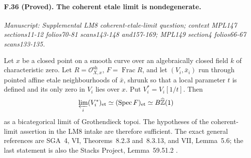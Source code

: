 \paragraph{F.36 (Proved). The coherent etale limit is nondegenerate.}
\textit{Manuscript: Supplemental LM8 coherent-etale-limit question; context MPL147 sections11-12 folios70-81 scans143-148 and157-169; MPL149 section4 folios66-67 scans133-135.}

Let $x$ be a closed point on a smooth curve over an algebraically closed
field $k$ of characteristic zero. Let $R=\mathcal O_{X,x}^{\mathrm{sh}}$,
$F=\operatorname{Frac}R$, and let $(V_i,\bar x_i)$ run through pointed
affine etale neighbourhoods of $\bar x$, shrunk so that a local parameter
$t$ is defined and its only zero in $V_i$ lies over $x$. Put
$V_i^*=V_i[1/t]$. Then
\[
 \varprojlim_i (V_i^*)_{\mathrm{et}}
   \simeq (\operatorname{Spec}F)_{\mathrm{et}}
   \simeq B\widehat{\mathbb Z}(1)
\]
as a bicategorical limit of Grothendieck topoi. The hypotheses of the
coherent-limit assertion in the LM8 intake are therefore sufficient.
The exact general references are SGA~4, VI, Theorems~8.2.3 and~8.3.13,
and VII, Lemma~5.6; the last statement is also the Stacks Project,
Lemma~59.51.2 \cite{SGA4II,StacksEtaleLimits}.

